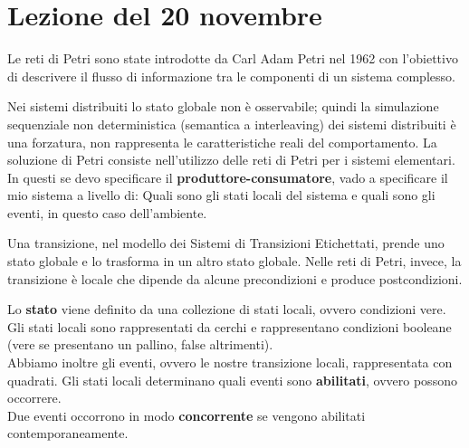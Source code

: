 \section{Lezione del 20 novembre}
Le reti di Petri sono state introdotte da Carl Adam Petri nel 1962 con l’obiettivo di descrivere il flusso di informazione tra le componenti di un sistema complesso.

Nei sistemi distribuiti lo stato globale non è osservabile; quindi la simulazione sequenziale non deterministica (semantica a interleaving) dei sistemi distribuiti è una forzatura, non rappresenta le caratteristiche reali del comportamento. La soluzione di Petri consiste nell’utilizzo delle reti di Petri per i sistemi elementari. In questi se devo specificare il \textbf{produttore-consumatore}, vado a specificare il mio sistema a livello di: Quali sono gli stati locali del sistema e quali sono gli eventi, in questo caso dell'ambiente.

Una transizione, nel modello dei Sistemi di Transizioni Etichettati, prende uno stato globale e lo trasforma in un altro stato globale. Nelle reti di Petri, invece, la transizione è locale che dipende da alcune precondizioni e produce postcondizioni.

Lo \textbf{stato} viene definito da una collezione di stati locali, ovvero condizioni vere. Gli stati locali sono rappresentati da cerchi e rappresentano condizioni booleane (vere se presentano un pallino, false altrimenti).\\

Abbiamo inoltre gli eventi, ovvero le nostre transizione locali, rappresentata con quadrati. Gli stati locali determinano quali eventi sono \textbf{abilitati}, ovvero possono occorrere. \\
Due eventi occorrono in modo \textbf{concorrente} se vengono abilitati contemporaneamente.
